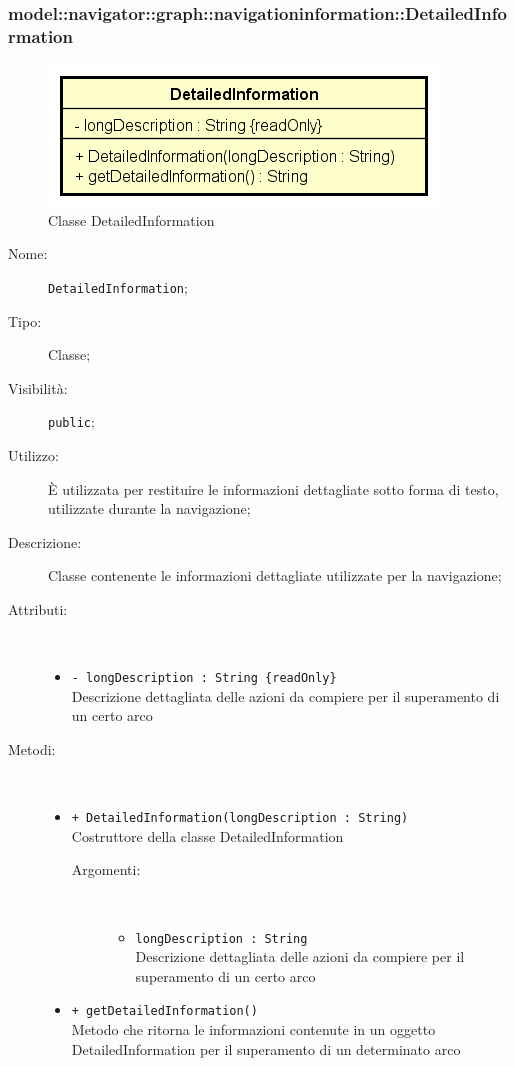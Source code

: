 \documentclass[../DefinizioneDiProdotto.tex]{subfiles}
\begin{document}
\subsubsection{model::navigator::graph::navigationinformation::DetailedInformation}

    \begin{figure}[H]
        \centering
        \includegraphics{img/DetailedInformation.png}
        \caption{Classe DetailedInformation}\label{fig:model::navigator::graph::navigationinformation::DetailedInformation} 
    \end{figure}
    \begin{description}
\item[Nome:] \texttt{DetailedInformation};
\item[Tipo:] Classe;
\item[Visibilità:] \texttt{public};
\item[Utilizzo:] È utilizzata per restituire le informazioni dettagliate sotto forma di testo, utilizzate durante la navigazione;
\item[Descrizione:] Classe contenente le informazioni dettagliate utilizzate per la navigazione;
\item[Attributi:] \
\begin{itemize}
\item \texttt{- longDescription : String \{readOnly\}}\\
Descrizione dettagliata delle azioni da compiere per il superamento di un certo arco

\end{itemize}
\item[Metodi:] \
\begin{itemize}
\item \texttt{+ DetailedInformation(longDescription : String)}\\
Costruttore della classe DetailedInformation
 \begin{description}
\item[Argomenti:] \
\begin{itemize}
\item \texttt{longDescription : String}\\
Descrizione dettagliata delle azioni da compiere per il superamento di un certo arco\end{itemize}
\end{description}
\item \texttt{+ getDetailedInformation()}\\
Metodo che ritorna le informazioni contenute in un oggetto DetailedInformation per il superamento di un determinato arco
 \end{itemize}
\end{description}
\end{document}
